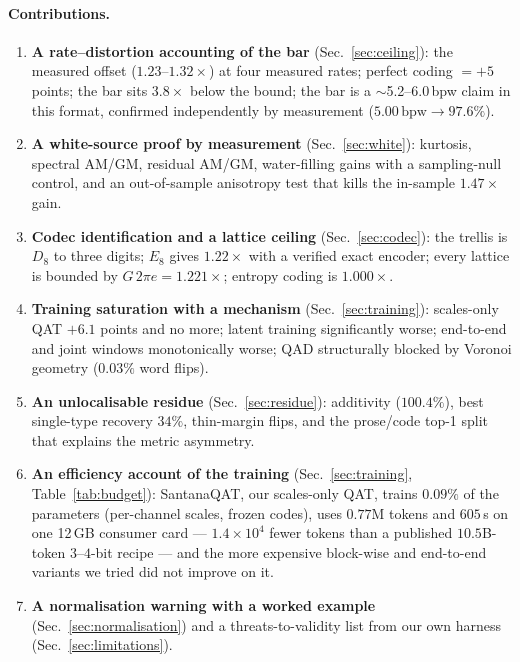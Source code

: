 \documentclass[11pt,a4paper]{article}
\newcommand{\bpw}{\,\mathrm{bpw}}
\begin{document}
\paragraph{Contributions.}
\begin{enumerate}[leftmargin=1.4em,itemsep=1pt]
\item \textbf{A rate--distortion accounting of the bar} (Sec.~\ref{sec:ceiling}): the measured
offset ($1.23$--$1.32\times$) at four measured rates; perfect coding $=+5$ points; the bar sits
$3.8\times$ below the bound; the bar is a $\sim$5.2--6.0\,bpw claim in this format, confirmed
independently by measurement ($5.00\bpw\to97.6\%$).
\item \textbf{A white-source proof by measurement} (Sec.~\ref{sec:white}): kurtosis, spectral
AM/GM, residual AM/GM, water-filling gains with a sampling-null control, and an out-of-sample
anisotropy test that kills the in-sample $1.47\times$ gain.
\item \textbf{Codec identification and a lattice ceiling} (Sec.~\ref{sec:codec}): the trellis is
$D_8$ to three digits; $E_8$ gives $1.22\times$ with a verified exact encoder; every lattice is
bounded by $G\,2\pi e=1.221\times$; entropy coding is $1.000\times$.
\item \textbf{Training saturation with a mechanism} (Sec.~\ref{sec:training}): scales-only QAT
$+6.1$ points and no more; latent training significantly worse; end-to-end and joint windows
monotonically worse; QAD structurally blocked by Voronoi geometry ($0.03\%$ word flips).
\item \textbf{An unlocalisable residue} (Sec.~\ref{sec:residue}): additivity ($100.4\%$), best
single-type recovery $34\%$, thin-margin flips, and the prose/code top-1 split that explains the
metric asymmetry.
\item \textbf{An efficiency account of the training} (Sec.~\ref{sec:training}, Table~\ref{tab:budget}):
SantanaQAT, our scales-only QAT, trains $0.09\%$ of the parameters (per-channel scales, frozen
codes), uses $0.77$M tokens and $605$\,s on one 12\,GB consumer card --- $1.4\times10^4$ fewer
tokens than a published $10.5$B-token $3$--$4$-bit recipe --- and the more expensive block-wise
and end-to-end variants we tried did not improve on it.
\item \textbf{A normalisation warning with a worked example} (Sec.~\ref{sec:normalisation}) and a
threats-to-validity list from our own harness (Sec.~\ref{sec:limitations}).
\end{enumerate}
\end{document}
